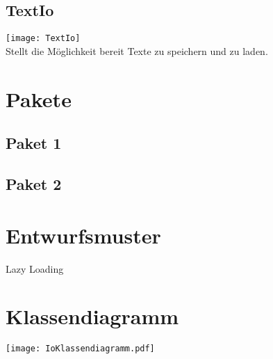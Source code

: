 \subsection{TextIo}\label{IO:TextIo}
\texttt{[image: TextIo]}\\
Stellt die Möglichkeit bereit Texte zu speichern und zu laden.
\beginMembers
{}
\closeMembers

\section{Pakete}
\subsection{Paket 1}
\subsection{Paket 2}
\section{Entwurfsmuster}
Lazy Loading

\section{Klassendiagramm}
\texttt{[image: IoKlassendiagramm.pdf]}
